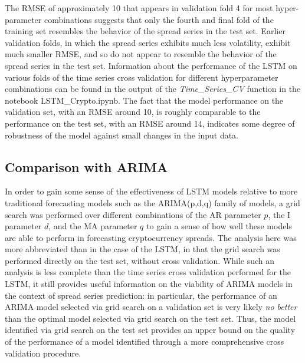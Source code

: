 \documentclass{article}
\begin{document}
The RMSE of approximately 10 that appears in validation fold 4 for most hyper-parameter combinations suggests that only the fourth and final fold of the training set resembles the behavior of the spread series in the test set. Earlier validation folds, in which the spread series exhibits much less volatility, exhibit much smaller RMSE, and so do not appear to resemble the behavior of the spread series in the test set. Information about the performance of the LSTM on various folds of the time series cross validation for different hyperparameter combinations can be found in the output of the \textit{Time\_Series\_CV} function in the notebook LSTM\_Crypto.ipynb. The fact that the model performance on the validation set, with an RMSE around 10, is roughly comparable to the performance on the test set, with an RMSE around 14, indicates some degree of robustness of the model against small changes in the input data. 


\subsection{Comparison with ARIMA}

In order to gain some sense of the effectiveness of LSTM models relative to more traditional forecasting models such as the ARIMA(p,d,q) family of models, a grid search was performed over different combinations of the AR parameter $p$, the I parameter $d$, and the MA parameter $q$ to gain a sense of how well these models are able to perform in forecasting cryptocurrency spreads. The analysis here was more abbreviated than in the case of the LSTM, in that the grid search was performed directly on the test set, without cross validation. While such an analysis is less complete than the time series cross validation performed for the LSTM, it still provides useful information on the viability of ARIMA models in the context of spread series prediction: in particular, the performance of an ARIMA model selected via grid search on a validation set is very likely \textit{no better} than the optimal model selected via grid search on the test set. Thus, the model identified via grid search on the test set provides an upper bound on the quality of the performance of a model identified through a more comprehensive cross validation procedure. 
\end{document}

